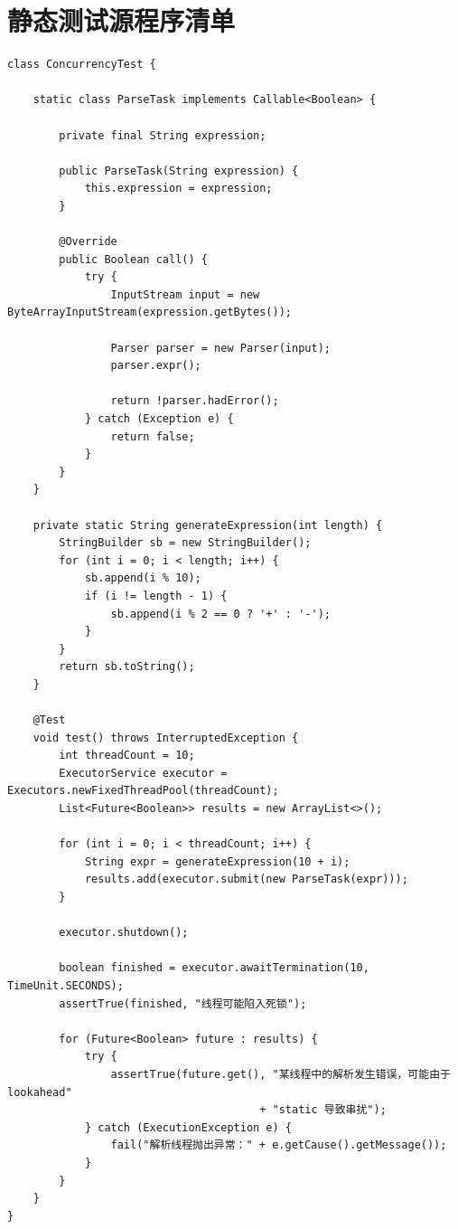 \documentclass[a4paper, twoside, utf8]{ctexart}
\begin{document}
    \section{静态测试源程序清单}

    \begin{verbatim}
class ConcurrencyTest {

    static class ParseTask implements Callable<Boolean> {
    
        private final String expression;

        public ParseTask(String expression) {
            this.expression = expression;
        }

        @Override
        public Boolean call() {
            try {
                InputStream input = new ByteArrayInputStream(expression.getBytes());

                Parser parser = new Parser(input);
                parser.expr();

                return !parser.hadError();
            } catch (Exception e) {
                return false;
            }
        }
    }

    private static String generateExpression(int length) {
        StringBuilder sb = new StringBuilder();
        for (int i = 0; i < length; i++) {
            sb.append(i % 10);
            if (i != length - 1) {
                sb.append(i % 2 == 0 ? '+' : '-');
            }
        }
        return sb.toString();
    }

    @Test
    void test() throws InterruptedException {
        int threadCount = 10;
        ExecutorService executor = Executors.newFixedThreadPool(threadCount);
        List<Future<Boolean>> results = new ArrayList<>();

        for (int i = 0; i < threadCount; i++) {
            String expr = generateExpression(10 + i);
            results.add(executor.submit(new ParseTask(expr)));
        }

        executor.shutdown();

        boolean finished = executor.awaitTermination(10, TimeUnit.SECONDS);
        assertTrue(finished, "线程可能陷入死锁");

        for (Future<Boolean> future : results) {
            try {
                assertTrue(future.get(), "某线程中的解析发生错误，可能由于 lookahead"
                                       + "static 导致串扰");
            } catch (ExecutionException e) {
                fail("解析线程抛出异常：" + e.getCause().getMessage());
            }
        }
    }
}
    \end{verbatim}
\end{document}
